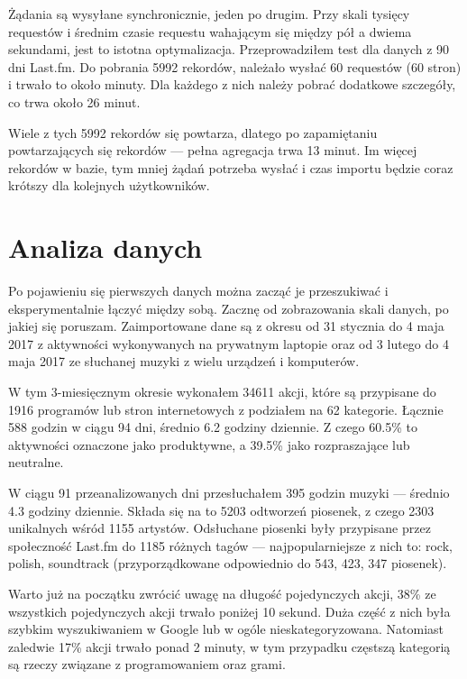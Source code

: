 \documentclass[openright]{xmgr}
\begin{document}
		Żądania są wysyłane synchronicznie, jeden po drugim.
		Przy skali tysięcy requestów i średnim czasie requestu wahającym się między pół a dwiema sekundami, jest to istotna optymalizacja.
		Przeprowadziłem test dla danych z 90 dni Last.fm. Do pobrania 5992 rekordów, należało wysłać 60 requestów (60 stron) i trwało to około minuty.
		Dla każdego z nich należy pobrać dodatkowe szczegóły, co trwa około 26 minut.

		Wiele z tych 5992 rekordów się powtarza, dlatego po zapamiętaniu powtarzających się rekordów --- pełna agregacja trwa 13 minut.
		Im więcej rekordów w bazie, tym mniej żądań potrzeba wysłać i czas importu będzie coraz krótszy dla kolejnych użytkowników.

\chapter{Analiza danych}

	Po pojawieniu się pierwszych danych można zacząć je przeszukiwać i eksperymentalnie łączyć między sobą.
	Zacznę od zobrazowania skali danych, po jakiej się poruszam.
	Zaimportowane dane są z okresu od 31 stycznia do 4 maja 2017 z aktywności wykonywanych na prywatnym laptopie
	oraz od 3 lutego do 4 maja 2017 ze słuchanej muzyki z wielu urządzeń i komputerów.

	W tym 3-miesięcznym okresie wykonałem 34611 akcji, które są przypisane do 1916 programów lub stron internetowych z podziałem na 62 kategorie.
	Łącznie 588 godzin w ciągu 94 dni, średnio 6.2 godziny dziennie.
	Z czego 60.5\% to aktywności oznaczone jako produktywne, a 39.5\% jako rozpraszające lub neutralne.

	W ciągu 91 przeanalizowanych dni przesłuchałem 395 godzin muzyki — średnio 4.3 godziny dziennie.
	Składa się na to 5203 odtworzeń piosenek, z czego 2303 unikalnych wśród 1155 artystów.
	Odsłuchane piosenki były przypisane przez społeczność Last.fm do 1185 różnych tagów — najpopularniejsze z nich to: rock, polish, soundtrack
	(przyporządkowane odpowiednio do 543, 423, 347 piosenek).

	Warto już na początku zwrócić uwagę na długość pojedynczych akcji, 38\% ze wszystkich pojedynczych akcji trwało poniżej 10 sekund.
	Duża część z nich była szybkim wyszukiwaniem w Google lub w ogóle nieskategoryzowana.
	Natomiast zaledwie 17\% akcji trwało ponad 2 minuty, w tym przypadku częstszą kategorią są rzeczy związane z programowaniem oraz grami.
\end{document}
